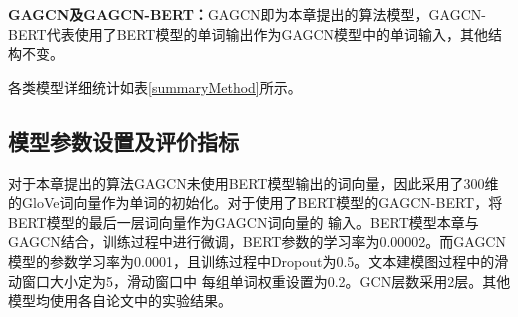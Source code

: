 \textbf{GAGCN及GAGCN-BERT：}GAGCN即为本章提出的算法模型，GAGCN-BERT代表使用了BERT模型的单词输出作为GAGCN模型中的单词输入，其他结构不变。

各类模型详细统计如表\ref{summaryMethod}所示。
\begin{table}[htb]
	\centering
	\caption{算法模型统计}
\end{table}

\subsection{模型参数设置及评价指标}
对于本章提出的算法GAGCN未使用BERT模型输出的词向量，因此采用了300维的GloVe词向量作为单词的初始化。对于使用了BERT模型的GAGCN-BERT，将BERT模型的最后一层词向量作为GAGCN词向量的
输入。BERT模型本章与GAGCN结合，训练过程中进行微调，BERT参数的学习率为0.00002。而GAGCN模型的参数学习率为0.0001，且训练过程中Dropout为0.5。文本建模图过程中的滑动窗口大小定为5，滑动窗口中
每组单词权重设置为0.2。GCN层数采用2层。其他模型均使用各自论文中的实验结果。

